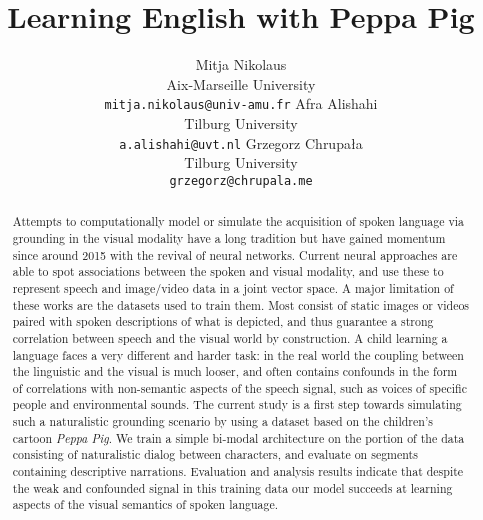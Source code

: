\documentclass[11pt,a4paper]{article}
\begin{document}
\title{Learning English with Peppa Pig}

\author{Mitja Nikolaus\\
  Aix-Marseille University\\
  \texttt{mitja.nikolaus@univ-amu.fr}
  \And
  Afra Alishahi\\
  Tilburg University\\
  \texttt{a.alishahi@uvt.nl}
  \And
  Grzegorz Chrupała\\
  Tilburg University\\
  \texttt{grzegorz@chrupala.me}}

\date{}


\maketitle
\begin{abstract}
  Attempts to computationally model or simulate the acquisition of
  spoken language via grounding in the visual modality have a long
  tradition but have gained momentum since around 2015 with the
  revival of neural networks. Current neural approaches are able to
  spot associations between the spoken and visual modality, and use
  these to represent speech and image/video data in a joint vector
  space. A major limitation of these works are the datasets used to
  train them. Most consist of static images or videos paired with
  spoken descriptions of what is depicted, and thus guarantee a strong
  correlation between speech and the visual world by construction. A
  child learning a language faces a very different and harder task: in
  the real world the coupling between the linguistic and the visual is
  much looser, and often contains confounds in the form of
  correlations with non-semantic aspects of the speech signal, such as
  voices of specific people and environmental sounds. The current
  study is a first step towards simulating such a naturalistic
  grounding scenario by using a dataset based on the children's
  cartoon {\it Peppa Pig}. We train a simple bi-modal architecture on
  the portion of the data consisting of naturalistic dialog between
  characters, and evaluate on segments containing descriptive
  narrations. Evaluation and analysis results indicate that despite
  the weak and confounded signal in this training data our model
  succeeds at learning aspects of the visual semantics of spoken
  language.
\end{abstract}









\end{document}

